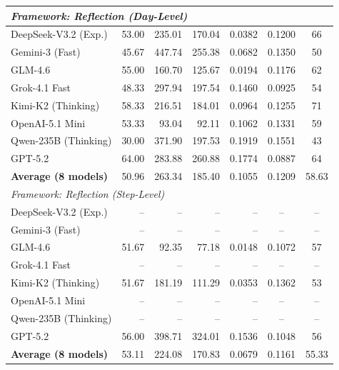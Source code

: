 \begin{table}[t]
{\begin{tabular}{lrrrrcc}
    \multicolumn{7}{l}{\cellcolor{gray!20}\textit{Framework: Reflection (Day-Level)}} \\
    \midrule
    DeepSeek-V3.2 (Exp.) & 53.00 & 235.01 & 170.04 & 0.0382 & 0.1200 & 66 \\
    Gemini-3 (Fast)      & 45.67 & 447.74 & 255.38 & 0.0682 & 0.1350 & 50 \\
    GLM-4.6              & 55.00 & 160.70 & 125.67 & 0.0194 & 0.1176 & 62 \\
    Grok-4.1 Fast        & 48.33 & 297.94 & 197.54 & 0.1460 & 0.0925 & 54 \\
    Kimi-K2 (Thinking)   & 58.33 & 216.51 & 184.01 & 0.0964 & 0.1255 & 71 \\
    OpenAI-5.1 Mini      & 53.33 & 93.04  & 92.11  & 0.1062 & 0.1331 & 59 \\
    Qwen-235B (Thinking) & 30.00 & 371.90 & 197.53 & 0.1919 & 0.1551 & 43 \\
    GPT-5.2              & 64.00 & 283.88 & 260.88 & 0.1774 & 0.0887 & 64 \\
    \midrule
    \textbf{Average (8 models)} 
        & 50.96 
        & 263.34 
        & 185.40 
        & 0.1055 
        & 0.1209 
        & 58.63 \\
    \midrule

    \multicolumn{7}{l}{\cellcolor{gray!20}\textit{Framework: Reflection (Step-Level)}} \\
    \midrule
    DeepSeek-V3.2 (Exp.) & -- & -- & -- & -- & -- & -- \\
    Gemini-3 (Fast)      & -- & -- & -- & -- & -- & -- \\
    GLM-4.6              & 51.67 & 92.35 & 77.18 & 0.0148 & 0.1072 & 57 \\
    Grok-4.1 Fast        & -- & -- & -- & -- & -- & -- \\
    Kimi-K2 (Thinking)   & 51.67 & 181.19 & 111.29 & 0.0353 & 0.1362 & 53 \\
    OpenAI-5.1 Mini      & -- & -- & -- & -- & -- & -- \\
    Qwen-235B (Thinking) & -- & -- & -- & -- & -- & -- \\
    GPT-5.2              & 56.00 & 398.71 & 324.01 & 0.1536 & 0.1048 & 56 \\
    \midrule
    \textbf{Average (8 models)} & 53.11 & 224.08 & 170.83 & 0.0679 & 0.1161 & 55.33 \\
    \midrule


\end{tabular}}
\end{table}
